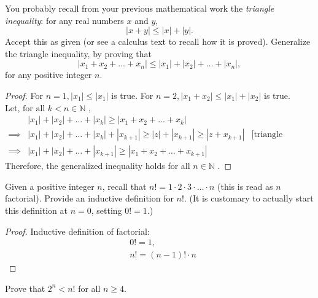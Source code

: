 \documentclass[12pt]{article}
\newenvironment{problem}[2][Problem]{\begin{trivlist}
\item[\hskip \labelsep {\bfseries #1}\hskip \labelsep {\bfseries #2.}]}{\end{trivlist}}
\begin{document}
\begin{problem}{3}
You probably recall from your previous mathematical work the \textit{triangle inequality}:
for any real numbers \( x \) and \( y \),
\[
	|x + y| \leq |x| + |y|.
\]
Accept this as given (or see a calculus text to recall how it is proved). Generalize the triangle inequality, by proving that
\[
	|x_1 + x_2 + \dots + x_n| \leq |x_1| + |x_2| + \dots + |x_n|,
\]
for any positive integer \( n \).

\end{problem}

\begin{proof}
	For $n = 1, |x_1| \leq |x_1|$ is true.
	For $n = 2, |x_1 + x_2| \leq |x_1| + |x_2|$ is true. \\
	Let, $\text{for all } k < n \in \mathbb{N}$ ,
	\begin{align*}
		         & |x_1| + |x_2| + \dots + |x_k| \geq |x_1 + x_2 + \dots + x_k|                                                     \\
		\implies & |x_1| + |x_2| + \dots + |x_k| + |x_ {k+1}|\geq |z| + |x_{k+1}| \geq |z + x_{k+1}| & \text{[triangle inequality]} \\
		\implies & |x_1| + |x_2| + \dots  + |x_ {k+1}| \geq |x_1 + x_2 + \dots + x_{k+1}|
	\end{align*}
	Therefore, the generalized inequality holds for all $n \in \mathbb{N}$ .

\end{proof}

\begin{problem}{4}
Given a positive integer \( n \), recall that \( n! = 1 \cdot 2 \cdot 3 \cdot \dots \cdot n \) (this is read as \( n \) factorial).
Provide an inductive definition for \( n! \). (It is customary to actually start this definition
at \( n = 0 \), setting \( 0! = 1 \).)

\end{problem}

\begin{proof}
	Inductive definition of factorial:
	\begin{align*}
		 & 0! = 1,             \\
		 & n! = (n-1)! \cdot n
	\end{align*}

\end{proof}

\begin{problem}{5}
Prove that \( 2^n < n! \) for all \( n \geq 4 \).

\end{problem}
\end{document}

